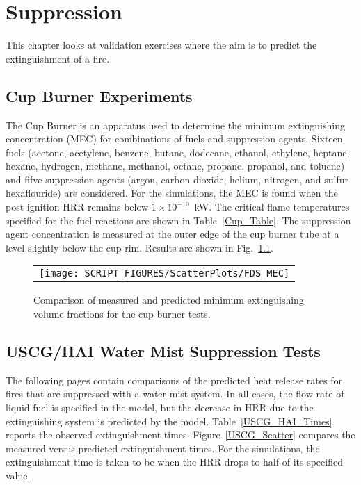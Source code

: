 
\chapter{Suppression}

This chapter looks at validation exercises where the aim is to predict the extinguishment of a fire.

\section{Cup Burner Experiments}
\label{Minimum Extinguishing Concentration}
The Cup Burner is an apparatus used to determine the minimum extinguishing concentration (MEC) for combinations of fuels and suppression agents. Sixteen fuels (acetone, acetylene, benzene, butane, dodecane, ethanol, ethylene, heptane, hexane, hydrogen, methane, methanol, octane, propane, propanol, and toluene) and fifve suppression agents (argon, carbon dioxide, helium, nitrogen, and sulfur hexaflouride) are considered. For the simulations, the MEC is found when the post-ignition HRR remains below $1 \times 10^{-10}$~kW. The critical flame temperatures specified for the fuel reactions are shown in Table~\ref{Cup_Table}. The suppression agent concentration is measured at the outer edge of the cup burner tube at a level slightly below the cup rim. Results are shown in Fig.~\ref{cup_burner_extinguish_vol}.

\newpage

\begin{figure}[t]
\begin{center}
\begin{tabular}{c}
\texttt{[image: SCRIPT\_FIGURES/ScatterPlots/FDS\_MEC]}
\end{tabular}
\end{center}
\caption[Results of Cup Burner experiments]{Comparison of measured and predicted minimum extinguishing volume fractions for the cup burner tests.}
\label{cup_burner_extinguish_vol}
\end{figure}

\clearpage

\section{USCG/HAI Water Mist Suppression Tests}
\label{Extinction Time}

The following pages contain comparisons of the predicted heat release rates for fires that are suppressed with a water mist system. In all cases, the flow rate of liquid fuel is specified in the model, but the decrease in HRR due to the extinguishing system is predicted by the model. Table~\ref{USCG_HAI_Times} reports the observed extinguishment times. Figure~\ref{USCG_Scatter} compares the measured versus predicted extinguishment times. For the simulations, the extinguishment time is taken to be when the HRR drops to half of its specified value.

